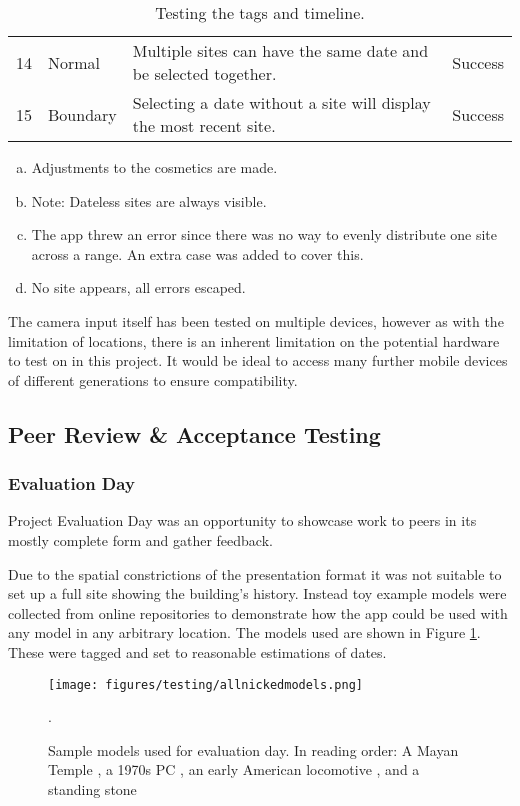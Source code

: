 \documentclass[12pt, a4paper]{article}
\begin{document}
\begin{table}[H]
\begin{tabular}{llll}
14         & Normal        & Multiple sites can have the same date and be selected together.            & Success                               \\
15         & Boundary      & Selecting a date without a site will display the most recent site.         & Success                              
\end{tabular}
\vspace{0.2cm}
\begin{enumerate}[(a)]
    \item Adjustments to the cosmetics are made.
    \item Note: Dateless sites are always visible.
    \item The app threw an error since there was no way to evenly distribute one site across a range. An extra case was added to cover this.
    \item No site appears, all errors escaped.
\end{enumerate}
\caption{Testing the tags and timeline.}
\label{table:tags}
\end{table}

The camera input itself has been tested on multiple devices, however as with the limitation of locations, there is an inherent limitation on the potential hardware to test on in this project. It would be ideal to access many further mobile devices of different generations to ensure compatibility.

\subsection{Peer Review \& Acceptance Testing}

\subsubsection{Evaluation Day}
Project Evaluation Day was an opportunity to showcase work to peers in its mostly complete form and gather feedback. 

Due to the spatial constrictions of the presentation format it was not suitable to set up a full site showing the building's history. Instead toy example models were collected from online repositories to demonstrate how the app could be used with any model in any arbitrary location. The models used are shown in Figure \ref{fig:evalmodels}. These were tagged and set to reasonable estimations of dates. 

\begin{figure}
    \texttt{[image: figures/testing/allnickedmodels.png]}
        \caption{Sample models used for evaluation day. In reading order: A Mayan Temple \cite{testing:mayantemple}, a 1970s PC \cite{testing:computer}, an early American locomotive \cite{testing:locomotive}, and a standing stone \cite{testing:standingstone}}.
        \label{fig:evalmodels}
\end{figure}
\end{document}
